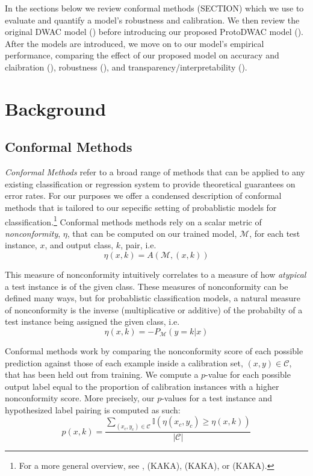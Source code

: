 \documentclass[11pt,letterpaper]{article}
\newcommand{\mc}{\mathcal}
\newcommand{\I}{\mathbb{I}}
\begin{document}
In the sections below we review conformal methods (SECTION) which we use to evaluate and quantify a model's robustness and calibration. We then review the original DWAC model () before introducing
our proposed ProtoDWAC model (). After the models are introduced, we move on to our model's empirical performance, comparing the effect of our proposed model on accuracy and claibration (), robustness (), and transparency/interpretability ().

\section{Background}
\subsection{Conformal Methods}
\textit{Conformal Methods} refer to a broad range of methods that can be applied to any existing classification or regression system to provide theoretical guarantees on error rates. For our purposes we offer a condensed description of conformal methods that is tailored to our sepecific setting of probablistic models for classification.\footnote{For a more general overview, see \citet{card.2019}, (KAKA), (KAKA), or (KAKA).} Conformal methods methods rely on a scalar metric of \textit{nonconformity}, $\eta$, that can be computed on our trained model, $\mc{M}$, for each test instance, $x$, and output class, $k$, pair, i.e.
\begin{equation}
\eta(x, k) = A(\mc{M}, (x, k))
\end{equation}

This measure of nonconformity intuitively correlates to a measure of how \textit{atypical} a test instance is of the given class. These measures of nonconformity can be defined many ways, but for probablistic classification models, a natural measure of nonconformity is the inverse (multiplicative or additive) of the probabilty of a test instance being assigned the given class, i.e.
\begin{equation} \label{inv.prob}
\eta(x, k) = -P_{\mc{M}}(y = k | x)
\end{equation}

Conformal methods work by comparing the nonconformity score of each possible prediction against those of each example inside a calibration set, $(x, y) \in \mc{C}$, that has been held out from training. We compute a $p$-value for each possible output label equal to the proportion of calibration instances with a higher nonconformity score. More precisely, our $p$-values for a test instance
and hypothesized label pairing is computed as such:
\begin{equation}
  p(x, k) = \frac{\sum_{(x_c, y_c) \in \mc{C}} \I(\eta(x_c, y_c) \geq \eta(x, k))}{|\mc{C}|}
\end{equation}
\end{document}
